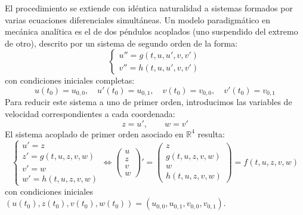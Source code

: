El procedimiento se extiende con idéntica naturalidad a sistemas formados por varias ecuaciones diferenciales simultáneas. Un modelo paradigmático en mecánica analítica es el de dos péndulos acoplados (uno suspendido del extremo de otro), descrito por un sistema de segundo orden de la forma:
\[
    \begin{cases}
        u'' = g(t, u, u', v, v') \\
        v'' = h(t, u, u', v, v')
    \end{cases}
\]
con condiciones iniciales completas:
\[
    u(t_0) = u_{0,0}, \quad u'(t_0) = u_{0,1}, \quad v(t_0) = v_{0,0}, \quad v'(t_0) = v_{0,1}
\]
Para reducir este sistema a uno de primer orden, introducimos las variables de velocidad correspondientes a cada coordenada:
\[
    z = u', \qquad w = v'
\]
El sistema acoplado de primer orden asociado en $\mathbb{R}^4$ resulta:
\[
    \begin{cases}
        u' = z \\
        z' = g(t, u, z, v, w) \\
        v' = w \\
        w' = h(t, u, z, v, w)
    \end{cases}
    \iff
    \begin{pmatrix} u \\ z \\ v \\ w \end{pmatrix}' = \begin{pmatrix} z \\ g(t, u, z, v, w) \\ w \\ h(t, u, z, v, w) \end{pmatrix} = f(t, u, z, v, w)
\]
con condiciones iniciales $(u(t_0), z(t_0), v(t_0), w(t_0)) = (u_{0,0}, u_{0,1}, v_{0,0}, v_{0,1})$.

